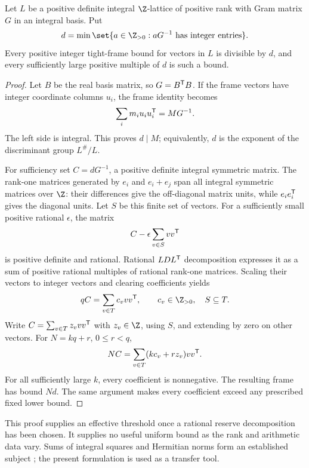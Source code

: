 \begin{theorem}\label{spn:thm:real-eventual}
Let $L$ be a positive definite integral $\Z$-lattice of positive rank with
Gram matrix $G$ in an integral basis. Put
\[
 d=\min\set{a\in\Z_{>0}: aG^{-1}\text{ has integer entries}} .
\]
Every positive integer tight-frame bound for vectors in $L$ is divisible by
$d$, and every sufficiently large positive multiple of $d$ is such a bound.
\end{theorem}

\begin{proof}
Let $B$ be the real basis matrix, so $G=B^{\mathsf{T}}B$. If the frame vectors have
integer coordinate columns $u_i$, the frame identity becomes
\[
 \sum_im_iu_iu_i^{\mathsf{T}}=MG^{-1}.
\]
The left side is integral. This proves $d\mid M$; equivalently, $d$ is the
exponent of the discriminant group $L^\#/L$.

For sufficiency set $C=dG^{-1}$, a positive definite integral symmetric
matrix. The rank-one matrices generated by $e_i$ and $e_i+e_j$ span all
integral symmetric matrices over $\Z$: their differences give the
off-diagonal matrix units, while $e_ie_i^{\mathsf{T}}$ gives the diagonal units.
Let $S$ be this finite set of vectors. For a sufficiently small positive
rational $\epsilon$, the matrix
\[
 C-\epsilon\sum_{v\in S}vv^{\mathsf{T}}
\]
is positive definite and rational. Rational $LDL^{\mathsf{T}}$ decomposition
expresses it as a sum of positive rational multiples of rational rank-one
matrices. Scaling their vectors to integer vectors and clearing coefficients
yields
\[
 qC=\sum_{v\in T}c_vvv^{\spnT},\qquad c_v\in\Z_{>0},\quad S\subseteq T .
\]
Write $C=\sum_{v\in T}z_vvv^{\mathsf{T}}$ with $z_v\in\Z$, using $S$, and extending
by zero on other vectors. For $N=kq+r$, $0\le r<q$,
\[
 NC=\sum_{v\in T}(kc_v+rz_v)vv^{\mathsf{T}}.
\]
For all sufficiently large $k$, every coefficient is nonnegative. The
resulting frame has bound $Nd$. The same argument makes every coefficient
exceed any prescribed fixed lower bound.
\end{proof}

This proof supplies an effective threshold once a rational reserve
decomposition has been chosen. It supplies no useful uniform bound as the rank
and arithmetic data vary. Sums of integral squares and Hermitian norms form an
established subject \cite{Beli2019Waring}; the present formulation is used as a
transfer tool.

